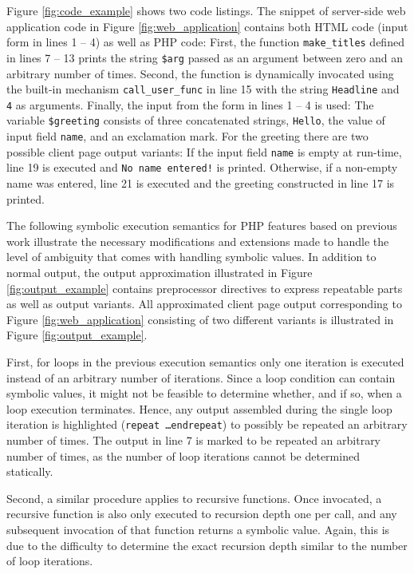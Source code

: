 \documentclass[sigconf, preprint]{acmart}
\begin{document}
Figure \ref{fig:code_example} shows two code listings. The snippet of server-side web
application code in Figure \ref{fig:web_application} contains both HTML code
(input form in lines 1 -- 4) as well as PHP code: First, the function
\texttt{make\_titles} defined in lines 7 – 13 prints the string \texttt{\$arg} 
passed as an argument between zero and an arbitrary number of times. Second, the
function is dynamically invocated using the built-in mechanism
\texttt{call\_user\_func} in line 15 with the string \texttt{Headline} and \texttt{4} as arguments.  
Finally, the input from the form in lines 1 – 4 is used: The variable \texttt{\$greeting} consists of three concatenated strings,
\texttt{Hello}, the value of input field \texttt{name}, and an exclamation mark.
For the greeting there are two possible client page output
variants: If the input field \texttt{name} is empty at run-time, line 19 is
executed and \texttt{No name entered!} is printed. Otherwise, if a non-empty
name was entered, line 21 is executed and the greeting constructed in line 17 is printed.

The following symbolic execution semantics for PHP features based on
previous work \cite{Nguyen:2014:BCG:2635868.2635928} illustrate the necessary
modifications and extensions made to handle the level of ambiguity that comes with handling symbolic values. 
In addition to normal output, the output approximation illustrated in
Figure \ref{fig:output_example} contains preprocessor directives to express
repeatable parts as well as output variants. All approximated client page
output corresponding to Figure \ref{fig:web_application} consisting of two
different variants is illustrated in Figure \ref{fig:output_example}.

First, for loops in the previous execution semantics
\cite{Nguyen:2014:BCG:2635868.2635928} only one iteration is executed instead of
an arbitrary number of iterations. Since a loop condition can contain symbolic
values, it might not be feasible to determine whether, and if so, when a loop
execution terminates. Hence, any output assembled during the single loop
iteration is highlighted (\texttt{repeat \ldots endrepeat}) to possibly be
repeated an arbitrary number of times. The output in line 7 is marked to be
repeated an arbitrary number of times, as the number of loop iterations cannot
be determined statically. 

Second, a similar procedure applies to recursive
functions. Once invocated, a recursive function is also only executed to
recursion depth one per call, and any subsequent invocation of that function returns a
symbolic value. Again, this is due to the difficulty to determine the exact
recursion depth similar to the number of loop iterations.
\end{document}
